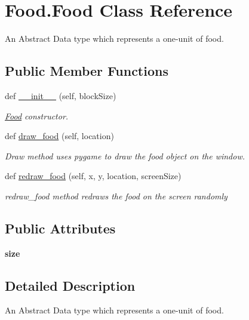 \hypertarget{classFood_1_1Food}{}\section{Food.\+Food Class Reference}
\label{classFood_1_1Food}


An Abstract Data type which represents a one-\/unit of food.  


\subsection*{Public Member Functions}
\begin{DoxyCompactItemize}
\item 
def \hyperlink{classFood_1_1Food_ae4c3146df2eab1cffad7a10bab5b721f}{\+\_\+\+\_\+init\+\_\+\+\_\+} (self, block\+Size)
\begin{DoxyCompactList}\small\item\em \hyperlink{classFood_1_1Food}{Food} constructor. \end{DoxyCompactList}\item 
def \hyperlink{classFood_1_1Food_aad94875bc7f2f6c990b826c9dc40092f}{draw\+\_\+food} (self, location)
\begin{DoxyCompactList}\small\item\em Draw method uses pygame to draw the food object on the window. \end{DoxyCompactList}\item 
def \hyperlink{classFood_1_1Food_a4a84b471eb86eaab7414ce1f28915fd6}{redraw\+\_\+food} (self, x, y, location, screen\+Size)
\begin{DoxyCompactList}\small\item\em redraw\+\_\+food method redraws the food on the screen randomly \end{DoxyCompactList}\end{DoxyCompactItemize}
\subsection*{Public Attributes}
\begin{DoxyCompactItemize}
\item 
{\bfseries size}\hypertarget{classFood_1_1Food_a811a8754b4796d69534a0649520a5993}{}\label{classFood_1_1Food_a811a8754b4796d69534a0649520a5993}

\end{DoxyCompactItemize}


\subsection{Detailed Description}
An Abstract Data type which represents a one-\/unit of food. 

